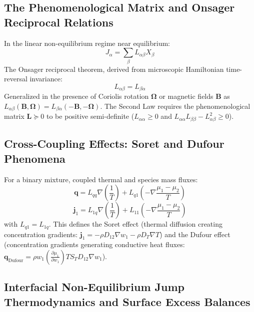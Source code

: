\documentclass[11pt,a4paper]{article}
\begin{document}
\subsection{The Phenomenological Matrix and Onsager Reciprocal Relations}
\label{subsec:onsager-reciprocal}

In the linear non-equilibrium regime near equilibrium:
\begin{equation}
J_\alpha = \sum_{\beta} L_{\alpha\beta} X_\beta
\end{equation}
The Onsager reciprocal theorem, derived from microscopic Hamiltonian time-reversal invariance:
\begin{equation}
L_{\alpha\beta} = L_{\beta\alpha}
\end{equation}
Generalized in the presence of Coriolis rotation $\boldsymbol{\Omega}$ or magnetic fields $\mathbf{B}$ as $L_{\alpha\beta}(\mathbf{B}, \boldsymbol{\Omega}) = L_{\beta\alpha}(-\mathbf{B}, -\boldsymbol{\Omega})$. The Second Law requires the phenomenological matrix $\mathbf{L} \succeq 0$ to be positive semi-definite ($L_{\alpha\alpha} \ge 0$ and $L_{\alpha\alpha}L_{\beta\beta} - L_{\alpha\beta}^2 \ge 0$).

\subsection{Cross-Coupling Effects: Soret and Dufour Phenomena}
\label{subsec:soret-dufour}

For a binary mixture, coupled thermal and species mass fluxes:
\begin{equation}
\mathbf{q} = L_{qq} \nabla\left(\frac{1}{T}\right) + L_{q1} \left( -\nabla\frac{\mu_1 - \mu_2}{T} \right)
\end{equation}
\begin{equation}
\mathbf{j}_1 = L_{1q} \nabla\left(\frac{1}{T}\right) + L_{11} \left( -\nabla\frac{\mu_1 - \mu_2}{T} \right)
\end{equation}
with $L_{q1} = L_{1q}$.
This defines the Soret effect (thermal diffusion creating concentration gradients: $\mathbf{j}_1 = -\rho D_{12} \nabla w_1 - \rho D_T \nabla T$) and the Dufour effect (concentration gradients generating conductive heat fluxes: $\mathbf{q}_{\text{Dufour}} = \rho w_1 (\frac{\partial \mu_1}{\partial w_1}) T S_T D_{12} \nabla w_1$).

\subsection{Interfacial Non-Equilibrium Jump Thermodynamics and Surface Excess Balances}
\label{subsec:surface-excess-balances}
\end{document}
